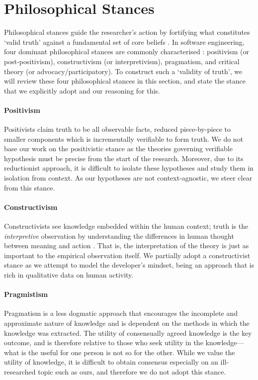 \section{Philosophical Stances}
\label{sec:research-methodology:philosophical-stances}


Philosophical stances guide the researcher's action by fortifying what constitutes `valid truth' against a fundamental set of core beliefs \citep{Ritzer:1991ge}. In software engineering, four dominant philosophical stances are commonly characterised \citep{Creswell:2017vn,Petersen:2019ji}: positivism (or post-positivism), constructivism (or interpretivism), pragmatism, and critical theory (or advocacy/participatory). To construct such a `validity of truth', we will review these four philosophical stances in this section, and state the stance that we explicitly adopt and our reasoning for this.

\paragraph{Positivism}
Positivists claim truth to be all observable facts, reduced piece-by-piece to smaller components which is incrementally verifiable to form truth. We do not base our work on the positivistic stance as the theories governing verifiable hypothesis must be precise from the start of the research. Moreover, due to its reductionist approach, it is difficult to isolate these hypotheses and study them in isolation from context.
As our hypotheses are not context-agnostic, we steer clear from this stance.

\paragraph{Constructivism}
Constructivists see knowledge embedded within the human context; truth is the \textit{interpretive} observation by understanding the differences in human thought between meaning and action \citep{Klein:1999uv}. That is, the interpretation of the theory is just as important to the empirical observation itself.
We partially adopt a constructivist stance as we attempt to model the developer's mindset, being an approach that is rich in qualitative data on human activity.

\paragraph{Pragmistism}
Pragmatism is a less dogmatic approach that encourages the incomplete and approximate nature of knowledge and is dependent on the methods in which the knowledge was extracted. The utility of consensually agreed knowledge is the key outcome, and is therefore relative to those who seek utility in the knowledge---what is the useful for one person is not so for the other. While we value the utility of knowledge, it is difficult to obtain consensus especially on an ill-researched topic such as ours, and therefore we do not adopt this stance.

